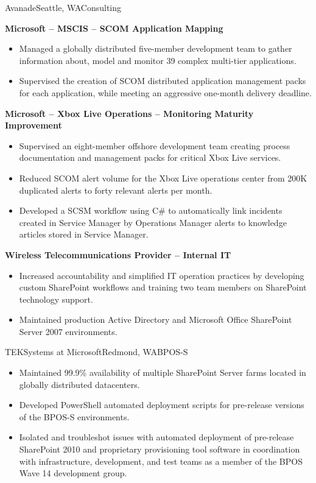 \documentclass[11pt,letter,roman]{moderncv}
\begin{document}
{Avanade}{Seattle, WA}{Consulting}{%
  \textbf{Microsoft -- MSCIS -- SCOM Application Mapping}
  \begin{itemize}
    \item Managed a globally distributed five-member development team to gather
      information about, model and monitor 39 complex multi-tier applications.
    \item Supervised the creation of SCOM distributed application management
      packs for each application, while meeting an aggressive one-month
      delivery deadline.
  \end{itemize}
  \textbf{Microsoft -- Xbox Live Operations -- Monitoring Maturity Improvement}
  \begin{itemize}
    \item Supervised an eight-member offshore development team creating process
      documentation and management packs for critical Xbox Live services.
    \item Reduced SCOM alert volume for the Xbox Live operations center from
      200K duplicated alerts to forty relevant alerts per month.
    \item Developed a SCSM workflow using C\# to automatically link incidents
      created in Service Manager by Operations Manager alerts to knowledge
      articles stored in Service Manager.
  \end{itemize}
  \textbf{Wireless Telecommunications Provider -- Internal IT}
  \begin{itemize}
    \item Increased accountability and simplified IT operation practices by
      developing custom SharePoint workflows and training two team members
      on SharePoint technology support.
    \item Maintained production Active Directory and Microsoft Office
      SharePoint Server 2007 environments.
  \end{itemize}
}
{TEKSystems at Microsoft}{Redmond, WA}{BPOS-S}{%
  \begin{itemize}
    \item Maintained 99.9\% availability of multiple SharePoint Server farms
      located in globally distributed datacenters.
    \item Developed PowerShell automated deployment scripts for pre-release
      versions of the BPOS-S environments.
    \item Isolated and troubleshot issues with automated deployment of
      pre-release SharePoint 2010 and proprietary provisioning tool software
      in coordination with infrastructure, development, and test teams as a
      member of the BPOS Wave 14 development group.
  \end{itemize}
}
\end{document}
